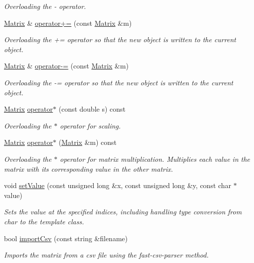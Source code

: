 \begin{DoxyCompactItemize}
\begin{DoxyCompactList}\small\item\em Overloading the -\/ operator. \end{DoxyCompactList}\item 
\hyperlink{class_matrix}{Matrix} \& \hyperlink{class_matrix_a480a72298ae1fc8443b0edfaa66d7c46}{operator+=} (const \hyperlink{class_matrix}{Matrix} \&m)
\begin{DoxyCompactList}\small\item\em Overloading the += operator so that the new object is written to the current object. \end{DoxyCompactList}\item 
\hyperlink{class_matrix}{Matrix} \& \hyperlink{class_matrix_a0e459fd035b2435ea016dc93c55ccac0}{operator-\/=} (const \hyperlink{class_matrix}{Matrix} \&m)
\begin{DoxyCompactList}\small\item\em Overloading the -\/= operator so that the new object is written to the current object. \end{DoxyCompactList}\item 
\hyperlink{class_matrix}{Matrix} \hyperlink{class_matrix_a7285ecf2cfdfdcf3a3e19b4cde235528}{operator$\ast$} (const double s) const
\begin{DoxyCompactList}\small\item\em Overloading the $\ast$ operator for scaling. \end{DoxyCompactList}\item 
\hyperlink{class_matrix}{Matrix} \hyperlink{class_matrix_a965f8987b92cfdbf8f17d3cf1bf0fa9b}{operator$\ast$} (\hyperlink{class_matrix}{Matrix} \&m) const
\begin{DoxyCompactList}\small\item\em Overloading the $\ast$ operator for matrix multiplication. Multiplies each value in the matrix with its corresponding value in the other matrix. \end{DoxyCompactList}\item 
void \hyperlink{class_matrix_ae511e2f5874e7602fc968541efeefca1}{set\+Value} (const unsigned long \&x, const unsigned long \&y, const char $\ast$value)
\begin{DoxyCompactList}\small\item\em Sets the value at the specified indices, including handling type conversion from char to the template class. \end{DoxyCompactList}\item 
bool \hyperlink{class_matrix_a0a5d9135e9807b81ddc3cf05e777a902}{import\+Csv} (const string \&filename)
\begin{DoxyCompactList}\small\item\em Imports the matrix from a csv file using the fast-\/csv-\/parser method. \end{DoxyCompactList}\end{DoxyCompactItemize}
